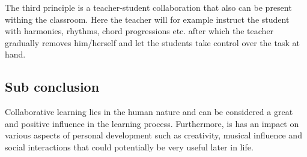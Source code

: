 The third principle is a teacher-student collaboration that also can be present withing the classroom. Here the teacher will for example instruct the student with harmonies, rhythms, chord progressions etc. after which the teacher gradually removes him/herself and let the students take control over the task at hand.\\


\subsection*{Sub conclusion}
Collaborative learning lies in the human nature and can be considered a great and positive influence in the learning process. Furthermore, is has an impact on various aspects of personal development such as creativity, musical influence and social interactions that could potentially be very useful later in life.


